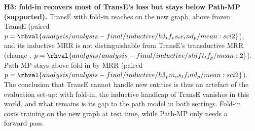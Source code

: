 \vspace{4pt}\noindent\textbf{H3: fold-in recovers most of TransE's loss but stays below Path-MP (supported).} TransE with fold-in reaches  on the new graph,  above frozen TransE (paired $p=\rhval{analysis/analysis-final/inductive/h3_tf_vs_te_ind_p/mean:sci2}$), and its inductive MRR is not distinguishable from TransE's transductive MRR (change , $p=\rhval{analysis/analysis-final/inductive/shift_tf_p/mean:2}$). Path-MP stays above fold-in by  MRR (paired $p=\rhval{analysis/analysis-final/inductive/h3_pm_vs_tf_ind_p/mean:sci2}$). The conclusion that TransE cannot handle new entities is thus an artefact of the evaluation set-up: with fold-in, the inductive handicap of TransE vanishes in this world, and what remains is its gap to the path model in both settings. Fold-in costs training on the new graph at test time, while Path-MP only needs a forward pass.
